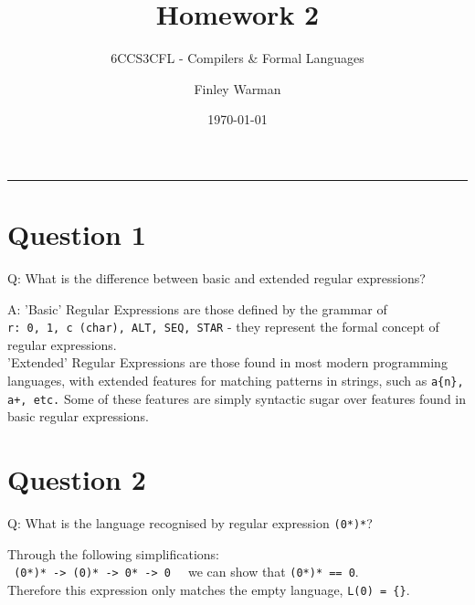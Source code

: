 \documentclass[english]{scrartcl}
\begin{document}


\subtitle{6CCS3CFL - Compilers \& Formal Languages}
\title{Homework 2}
\author{Finley Warman}
\date{\today}

\maketitle


\tableofcontents
\par\noindent\rule{\textwidth}{0.4pt}


\newpage


\section*{Question 1}
Q: What is the difference between basic and extended regular expressions?

A: 'Basic' Regular Expressions are those defined by the grammar of \\
\verb~r: 0, 1, c (char), ALT, SEQ, STAR~ - they represent the formal concept of regular expressions. \\
'Extended' Regular Expressions are those found in most modern programming languages, with extended features for matching patterns in strings,
 such as \verb~a{n}, a+, etc.~ Some of these features are simply
syntactic sugar over features found in basic regular expressions.

\section*{Question 2}
Q: What is the language recognised by regular expression \verb|(0*)*|?

Through the following simplifications: \\
\verb~ (0*)* -> (0)* -> 0* -> 0  ~ we can show that \verb~(0*)* == 0~. \\
Therefore this expression only matches the empty language, \verb~L(0) = {}~.

\end{document}
